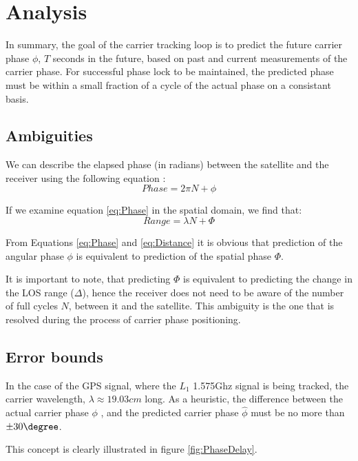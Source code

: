 \chapter{Analysis}\label{ch:Analysis}

In summary, the goal of the carrier tracking loop is to predict the future carrier phase $\phi$, $T$ seconds in the future, based on past and current measurements of the carrier phase. For successful phase lock to be maintained, the predicted phase must be within a small fraction of a cycle of the actual phase on a consistant basis.

\section{Ambiguities}

We can describe the elapsed phase (in radians) between the satellite and the receiver using the following equation :  
\begin{equation}
Phase = 2 \pi N  + \phi 
\label{eq:Phase}
\end{equation}

If we examine equation \ref{eq:Phase} in the spatial domain, we find that: 
\begin{equation}
Range = \lambda N + \Phi
\label{eq:Distance}
\end{equation}

From Equations \ref{eq:Phase} and \ref{eq:Distance} it is obvious that prediction of the angular phase $\phi$ is equivalent to prediction of the spatial phase $\Phi$.

It is important to note, that predicting $\Phi$ is equivalent to predicting the change in the LOS range ($\Delta$), hence the receiver does not need to be aware of the number of full cycles $N$, between it and the satellite. This ambiguity is the one that is resolved during the process of carrier phase positioning. 

\section{Error bounds}
In the case of the GPS signal, where the $L_1$ 1.575Ghz signal is being tracked, the carrier wavelength, $\lambda \approx 19.03 cm$ long. As a heuristic, the difference between the actual carrier phase $\phi$ , and the predicted carrier phase $\hat{\phi}$ must be no more than $\pm30 \degree$. 

This concept is clearly illustrated in figure \ref{fig:PhaseDelay}. 

